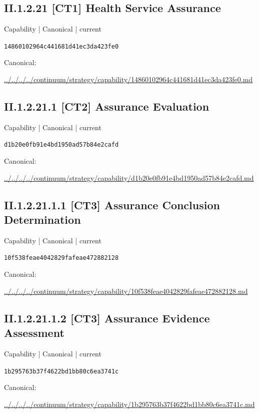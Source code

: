 \documentclass[10pt,a4paper]{article}
\begin{document}
\subsection*{II.1.2.21 [CT1] Health Service Assurance}
{\small Capability | Canonical | current}\par
\texttt{14860102964c441681d41ec3da423fe0}\par
Canonical: \par
{\footnotesize\url{../../../../continuum/strategy/capability/14860102964c441681d41ec3da423fe0.md}}\par
\subsection*{II.1.2.21.1 [CT2] Assurance Evaluation}
{\small Capability | Canonical | current}\par
\texttt{d1b20e0fb91e4bd1950ad57b84e2cafd}\par
Canonical: \par
{\footnotesize\url{../../../../continuum/strategy/capability/d1b20e0fb91e4bd1950ad57b84e2cafd.md}}\par
\subsection*{II.1.2.21.1.1 [CT3] Assurance Conclusion Determination}
{\small Capability | Canonical | current}\par
\texttt{10f538feae4042829fafeae472882128}\par
Canonical: \par
{\footnotesize\url{../../../../continuum/strategy/capability/10f538feae4042829fafeae472882128.md}}\par
\subsection*{II.1.2.21.1.2 [CT3] Assurance Evidence Assessment}
{\small Capability | Canonical | current}\par
\texttt{1b295763b37f4622bd1bb80c6ea3741c}\par
Canonical: \par
{\footnotesize\url{../../../../continuum/strategy/capability/1b295763b37f4622bd1bb80c6ea3741c.md}}\par
\end{document}
